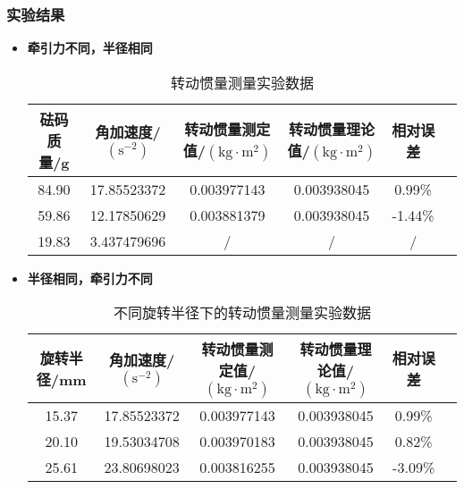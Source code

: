 \documentclass[12pt,hyperref,a4paper,UTF8]{ctexart}
\begin{document}
\subsubsection{实验结果}
    \begin{itemize}
        \item \textbf{牵引力不同，半径相同}
            \begin{table}[h!]
                \centering
                \begin{tabular}{cccccc}
                \toprule
                \textbf{砝码质量/g} & \textbf{角加速度/$(\text{s}^{-2})$} & \textbf{转动惯量测定值/$(\text{kg}\cdot \text{m}^2)$} & \textbf{转动惯量理论值/$(\text{kg}\cdot \text{m}^2)$} & \textbf{相对误差} \\
                \midrule
                84.90 & 17.85523372 & 0.003977143 & 0.003938045 & 0.99\% \\
                59.86 & 12.17850629 & 0.003881379 & 0.003938045 & -1.44\% \\
                19.83 & 3.437479696 & /          & /          & / \\
                \bottomrule
                \end{tabular}
                \caption{转动惯量测量实验数据}
                \end{table}
                
        \item \textbf{半径相同，牵引力不同}
            \begin{table}[h!]
                \centering
                \begin{tabular}{cccccc}
                \toprule
                \textbf{旋转半径/mm} & \textbf{角加速度/$(\text{s}^{-2})$} & \textbf{转动惯量测定值/$(\text{kg}\cdot \text{m}^2)$} & \textbf{转动惯量理论值/$(\text{kg}\cdot \text{m}^2)$} & \textbf{相对误差} \\
                \midrule
                15.37 & 17.85523372 & 0.003977143 & 0.003938045 & 0.99\% \\
                20.10 & 19.53034708 & 0.003970183 & 0.003938045 & 0.82\% \\
                25.61 & 23.80698023 & 0.003816255 & 0.003938045 & -3.09\% \\
                \bottomrule
                \end{tabular}
                \caption{不同旋转半径下的转动惯量测量实验数据}
                \end{table}
                
    \end{itemize}
\end{document}
